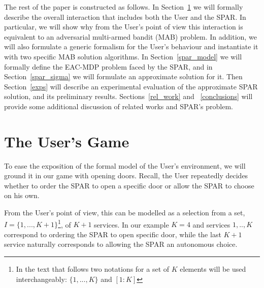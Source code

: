 \documentclass{msdm2012}
\begin{document}

The rest of the paper is constructed as follows. In
Section~\ref{User_model} we will formally describe the overall
interaction that includes both the User and the SPAR. In particular,
we will show why from the User's point of view this interaction is
equivalent to an adversarial multi-armed bandit (MAB) problem. In
addition, we will also formulate a generic formalism for the User's
behaviour and instantiate it with two specific MAB solution
algorithms. In Section~\ref{spar_model} we will formally define the
EAC-MDP problem faced by the SPAR, and in Section~\ref{spar_sigma} we
will formulate an approximate solution for it. Then Section~\ref{exps}
will describe an experimental evaluation of the approximate SPAR
solution, and its preliminary results. Sections~\ref{rel_work} and
~\ref{conclusions} will provide some additional discussion of related
works and SPAR's problem.

\section{The User's Game}\label{User_model}

To ease the exposition of the formal model of the User's environment,
we will ground it in our game with opening doors. Recall, the User
repeatedly decides whether to order the SPAR to open a specific door
or allow the SPAR to choose on his own.

From the User's point of view, this can be modelled as a selection
from a set, $I=\{1,...,K+1\}$\footnote{In the text that follows two
  notations for a set of $K$ elements will be used interchangeably:
  $\{1,...,K\}$ and $[1:K]$}, of $K+1$ services. In our example $K=4$
and services $1,..,K$ correspond to ordering the SPAR to open specific
door, while the last $K+1$ service naturally corresponds to allowing
the SPAR an autonomous choice.
\end{document}
